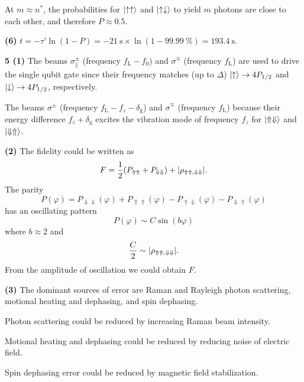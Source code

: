 \documentclass{article}
\makeatletter
\newcommand*{\shifttext}[1]{%
  \settowidth{\@tempdima}{#1}%
  \hspace{-\@tempdima}#1%
}
\newcommand{\plabel}[1]{%
\shifttext{\textbf{#1}\quad}%
}
\newcommand{\prule}{%
\begin{center}%
\hdashrule[0.5ex]{.99\linewidth}{1pt}{1pt 2.5pt}%
\end{center}%
}
\makeatother
\begin{document}
At $m\approx n^*$, the probabilities for $\ket{\uparrow\uparrow}$ and $\ket{\uparrow\downarrow}$ to yield $m$ photons are close to each other, and therefore $P\approx \num{0.5}$.

\plabel{(6)}%
$t = -\tau' \ln (1-P) = -\SI{21}{\second}\times \ln(1-\SI{99.99}{\percent}) = \SI{193.4}{\second}$.

\prule

\plabel{5 (1)}%
The beams $\sigma^\pm_\parallel$ (frequency $f_{\mathrm{L}} - f_0$) and $\sigma^\mp$ (frequency $f_{\mathrm{L}}$) are used to drive the single qubit gate since their frequency matches (up to $\Delta$) $\ket{\uparrow} \rightarrow 4P_{1/2}$ and $\ket{\downarrow} \rightarrow 4P_{1/2}$, respectively.
\par
The beams $\sigma^\pm$ (frequency $f_{\mathrm{L}} - f_{z} - \delta_{\mathrm{g}}$) and $\sigma^\mp$ (frequency $f_{\mathrm{L}}$) because their energy difference $f_{z} + \delta_{\mathrm{g}}$ excites the vibration mode of frequency $f_z$ for $\ket{\Uparrow\Downarrow}$ and $\ket{\Downarrow\Uparrow}$.

\plabel{(2)}%
The fidelity could be written as
\[ F = \frac{1}{2}(P_{\Uparrow\Uparrow} + P_{\Downarrow\Downarrow}) + \abs{\rho_{\Uparrow\Uparrow,\Downarrow\Downarrow}}. \]
The parity
\[ P(\varphi) = P_{\Downarrow\Downarrow}(\varphi) + P_{\Uparrow\Uparrow}(\varphi) - P_{\Uparrow\Downarrow}(\varphi) - P_{\Downarrow\Uparrow}(\varphi) \]
has an oscillating pattern
\[ P(\varphi) \sim C \sin(b \varphi) \]
where $b\approx 2$ and
\[ \frac{C}{2} \sim \abs{\rho_{\Uparrow\Uparrow,\Downarrow\Downarrow}}. \]
From the amplitude of oscillation we could obtain $F$.

\plabel{(3)}%
The dominant sources of error are Raman and Rayleigh photon scattering, motional heating and dephasing, and spin dephasing.
\par
Photon scattering could be reduced by increasing Raman beam intensity.
\par
Motional heating and dephasing could be reduced by reducing noise of electric field.
\par
Spin dephasing error could be reduced by magnetic field stabilization.


% 
% 
\end{document}

